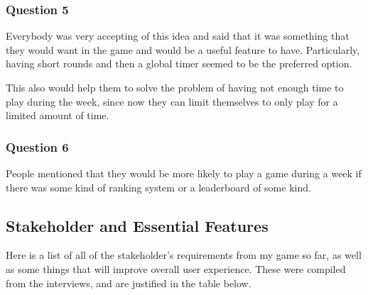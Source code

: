 \subsubsection{Question 5}

Everybody was very accepting of this idea and said that it was something that they would want in the game and would be a useful feature to have. Particularly, having short rounds and then a global timer seemed to be the preferred option.

\vs
This also would help them to solve the problem of having not enough time to play during the week, since now they can limit themselves to only play for a limited amount of time.

\subsubsection{Question 6}

People mentioned that they would be more likely to play a game during a week if there was some kind of ranking system or a leaderboard of some kind.

\subsection{Stakeholder and Essential Features}

Here is a list of all of the stakeholder's requirements from my game so far, as well as some things that will improve overall user experience. These were compiled from the interviews, and are justified in the table below.


